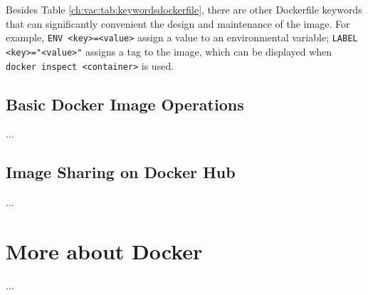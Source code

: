 Besides Table \ref{ch:vac:tab:keywordsdockerfile}, there are other Dockerfile keywords that can significantly convenient the design and maintenance of the image. For example, \verb|ENV <key>=<value>| assign a value to an environmental variable; \verb|LABEL <key>="<value>"| assigns a tag to the image, which can be displayed when \verb|docker inspect <container>| is used.

\subsection{Basic Docker Image Operations}

...

\subsection{Image Sharing on Docker Hub}


...


\section{More about Docker}

...













